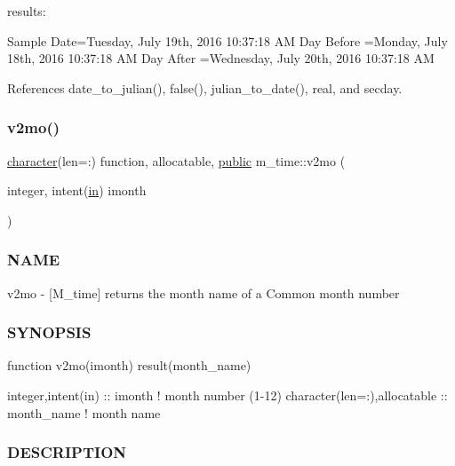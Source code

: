 \begin{DoxyVerb}
\begin{DoxyVerb}
results:

 Sample Date=Tuesday, July 19th, 2016 10:37:18 AM
 Day Before =Monday, July 18th, 2016 10:37:18 AM
 Day After  =Wednesday, July 20th, 2016 10:37:18 AM \end{DoxyVerb}
 

References date\+\_\+to\+\_\+julian(), false(), julian\+\_\+to\+\_\+date(), real, and secday.

\mbox{\label{namespacem__time_a6f28cf00e4998bb50bb503f5e4bd3f77}} 
\subsubsection{\texorpdfstring{v2mo()}{v2mo()}}
{\footnotesize\ttfamily \hyperlink{option__stopwatch_83_8txt_abd4b21fbbd175834027b5224bfe97e66}{character}(len=\+:) function, allocatable, \hyperlink{M__stopwatch_83_8txt_a2f74811300c361e53b430611a7d1769f}{public} m\+\_\+time\+::v2mo (\begin{DoxyParamCaption}\item[{integer, intent(\hyperlink{M__journal_83_8txt_afce72651d1eed785a2132bee863b2f38}{in})}]{imonth }\end{DoxyParamCaption})}



\subsubsection*{N\+A\+ME}

v2mo -\/ \mbox{[}M\+\_\+time\mbox{]} returns the month name of a Common month number 

\subsubsection*{S\+Y\+N\+O\+P\+S\+IS}

\begin{DoxyVerb}function v2mo(imonth) result(month_name)

 integer,intent(in)           :: imonth      ! month number (1-12)
 character(len=:),allocatable :: month_name  ! month name
\end{DoxyVerb}


\subsubsection*{D\+E\+S\+C\+R\+I\+P\+T\+I\+ON}


\end{DoxyVerb}
